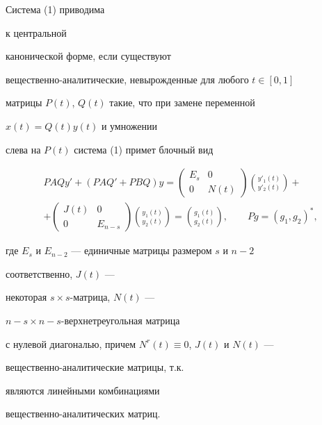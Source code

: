 \begin{defn} Система (1) приводима


к центральной


канонической форме, если существуют


вещественно-аналитические, невырожденные для любого $t\in[0,1]$


матрицы $P(t)$, $Q(t)$ такие, что при замене переменной


$x(t)=Q(t)y(t)$ и умножении


слева на $P(t)$ система (1) примет блочный вид


\begin{multline}


PAQy'+(PAQ'+PBQ)y=


\begin{pmatrix}


E_s & 0\\


0 & N(t)


\end{pmatrix}


\binom{y'_1(t)}{y'_2(t)}+\\


+


\begin{pmatrix}


J(t) & 0\\


0 & E_{n-s}


\end{pmatrix}


\binom{y_1(t)}{y_2(t)}=\binom{g_1(t)}{g_2(t)},\qquad


Pg=(g_1,g_2)^*,


\end{multline}


где $E_s$ и $E_{n-2}$ --- единичные матрицы размером $s$ и $n-2$


соответственно, $J(t)$ ---


некоторая $s\times s$-матрица, $N(t)$ ---


$n-s\times n-s$-верхнетреугольная матрица


с нулевой диагональю, причем $N^r(t)\equiv 0$, $J(t)$ и $N(t)$ ---


вещественно-аналитические матрицы, т.к.


являются линейными комбинациями


вещественно-аналитических матриц.


\end{defn}





